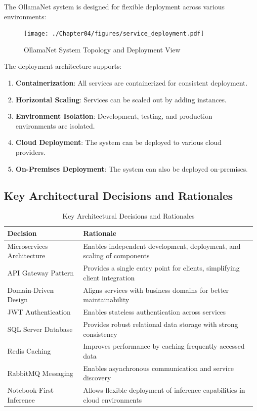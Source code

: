 The OllamaNet system is designed for flexible deployment across various environments:

\begin{figure}
    \centering
    \texttt{[image: ./Chapter04/figures/service\_deployment.pdf]}
    \caption{OllamaNet System Topology and Deployment View}
    \label{fig:system-topology}
\end{figure}
\clearpage

The deployment architecture supports:

\begin{enumerate}
   \item \textbf{Containerization}: All services are containerized for consistent deployment.
   \item \textbf{Horizontal Scaling}: Services can be scaled out by adding instances.
   \item \textbf{Environment Isolation}: Development, testing, and production environments are isolated.
   \item \textbf{Cloud Deployment}: The system can be deployed to various cloud providers.
   \item \textbf{On-Premises Deployment}: The system can also be deployed on-premises.
\end{enumerate}

\subsection{Key Architectural Decisions and Rationales}

\begin{table}[h]
  \centering
  \caption{Key Architectural Decisions and Rationales}
  \label{tab:architectural-decisions}
  \begin{tabular}{|p{}|p{}|}
    \hline
    \textbf{Decision} & \textbf{Rationale} \\
    \hline
    Microservices Architecture & Enables independent development, deployment, and scaling of components \\
    \hline
    API Gateway Pattern & Provides a single entry point for clients, simplifying client integration \\
    \hline
    Domain-Driven Design & Aligns services with business domains for better maintainability \\
    \hline
    JWT Authentication & Enables stateless authentication across services \\
    \hline
    SQL Server Database & Provides robust relational data storage with strong consistency \\
    \hline
    Redis Caching & Improves performance by caching frequently accessed data \\
    \hline
    RabbitMQ Messaging & Enables asynchronous communication and service discovery \\
    \hline
    Notebook-First Inference & Allows flexible deployment of inference capabilities in cloud environments \\
    \hline
  \end{tabular}
\end{table}

